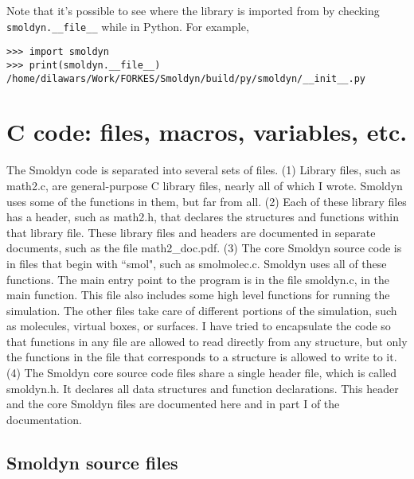 \documentclass {scrbook}
\begin{document}
Note that it's possible to see where the library is imported from by checking
\verb|smoldyn.__file__| while in Python. For example,

\begin{verbatim}
>>> import smoldyn
>>> print(smoldyn.__file__)
/home/dilawars/Work/FORKES/Smoldyn/build/py/smoldyn/__init__.py
\end{verbatim}


\chapter{C code: files, macros, variables, etc.}

The Smoldyn code is separated into several sets of files. (1) Library files, such as math2.c, are general-purpose C library files, nearly all of which I wrote. Smoldyn uses some of the functions in them, but far from all. (2) Each of these library files has a header, such as math2.h, that declares the structures and functions within that library file. These library files and headers are documented in separate documents, such as the file math2\_doc.pdf. (3) The core Smoldyn source code is in files that begin with ``smol", such as smolmolec.c. Smoldyn uses all of these functions. The main entry point to the program is in the file smoldyn.c, in the main function. This file also includes some high level functions for running the simulation. The other files take care of different portions of the simulation, such as molecules, virtual boxes, or surfaces. I have tried to encapsulate the code so that functions in any file are allowed to read directly from any structure, but only the functions in the file that corresponds to a structure is allowed to write to it. (4) The Smoldyn core source code files share a single header file, which is called smoldyn.h. It declares all data structures and function declarations. This header and the core Smoldyn files are documented here and in part I of the documentation.

\section{Smoldyn source files}
\end{document}
